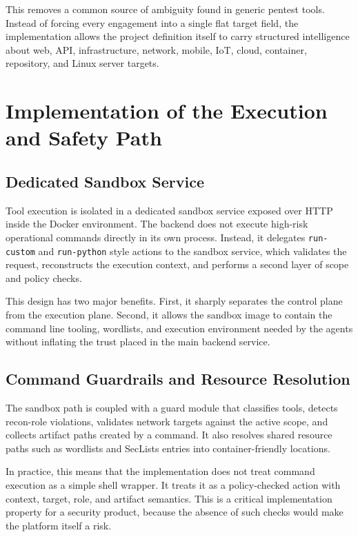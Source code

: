 \documentclass[12pt,a4paper]{report}
\begin{document}
This removes a common source of ambiguity found in generic pentest tools. Instead of
forcing every engagement into a single flat target field, the implementation allows
the project definition itself to carry structured intelligence about web, API,
infrastructure, network, mobile, IoT, cloud, container, repository, and Linux
server targets.

\section{Implementation of the Execution and Safety Path}

\subsection{Dedicated Sandbox Service}

Tool execution is isolated in a dedicated sandbox service exposed over HTTP inside
the Docker environment. The backend does not execute high-risk operational commands
directly in its own process. Instead, it delegates \texttt{run-custom} and
\texttt{run-python} style actions to the sandbox service, which validates the
request, reconstructs the execution context, and performs a second layer of scope
and policy checks.

This design has two major benefits. First, it sharply separates the control plane
from the execution plane. Second, it allows the sandbox image to contain the command
line tooling, wordlists, and execution environment needed by the agents without
inflating the trust placed in the main backend service.

\subsection{Command Guardrails and Resource Resolution}

The sandbox path is coupled with a guard module that classifies tools, detects
recon-role violations, validates network targets against the active scope, and
collects artifact paths created by a command. It also resolves shared resource paths
such as wordlists and SecLists entries into container-friendly locations.

In practice, this means that the implementation does not treat command execution as a
simple shell wrapper. It treats it as a policy-checked action with context, target,
role, and artifact semantics. This is a critical implementation property for a
security product, because the absence of such checks would make the platform itself a
risk.
\end{document}

